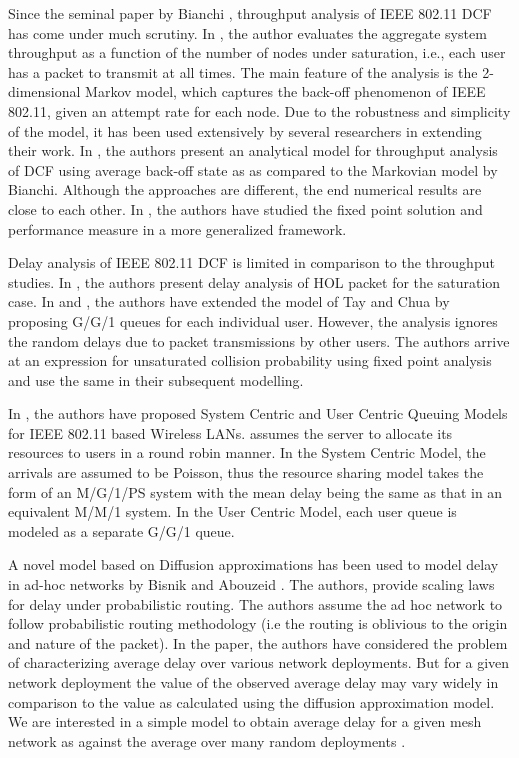 \documentclass[10pt, conference, compsocconf]{IEEEtran}
\begin{document}
Since the seminal paper by Bianchi \cite{bianchi}, throughput analysis of IEEE 802.11 DCF has come under much scrutiny. In \cite{bianchi}, the author evaluates the aggregate system throughput as a function of the number of nodes under saturation, i.e., each user has a packet to transmit at all times. The main feature of the analysis is the 2-dimensional Markov model, which captures the back-off phenomenon of IEEE 802.11, given an attempt rate for each node. Due to the robustness and simplicity of the model, it has been used extensively by several researchers in extending their work.  In \cite{tay}, the authors present an analytical model for throughput analysis of DCF using
average back-off state as as compared to the Markovian model by Bianchi. Although the approaches are different, the end numerical results are close to each other. In \cite{akumar}, the authors have studied the fixed point solution and performance measure in a more generalized framework.

Delay analysis of IEEE 802.11 DCF is limited in comparison to the throughput studies. In \cite{mmc}, the authors present delay analysis of HOL packet for the saturation case. In \cite{tickoo} and \cite{sikdar}, the authors have extended the model of Tay and Chua \cite{tay} by proposing G/G/1 queues for each individual user. However, the analysis ignores the random delays due to packet transmissions by other users. The authors arrive at an expression for unsaturated collision probability using fixed point analysis and use the same in their subsequent modelling. 

In \cite{tobagi}, the authors have proposed System Centric and User Centric Queuing Models for IEEE 802.11 based Wireless LANs. \cite{tobagi} assumes the server to allocate its resources to users in a round robin manner. In the System Centric Model, the arrivals are assumed to be Poisson, thus the resource sharing model takes the form of an M/G/1/PS system with the mean delay being the same as that in an equivalent M/M/1 system. In the User Centric  Model, each user queue is modeled as a separate G/G/1 queue. 

A novel model based on Diffusion approximations has been used to model delay in  ad-hoc networks  by Bisnik and Abouzeid \cite{bisnik}. The authors, provide scaling laws for delay under probabilistic routing. The authors assume the ad hoc network to follow probabilistic routing methodology (i.e the routing is oblivious to the origin and nature of the packet). In the paper, the authors have considered the problem of characterizing average delay over various network deployments. But for a given network deployment the value of the observed average delay may vary widely in comparison to the value as calculated using the diffusion approximation model. We are interested in a simple model to obtain average delay for a given mesh network as against the average over many random deployments \cite{bisnik}.
\end{document}
